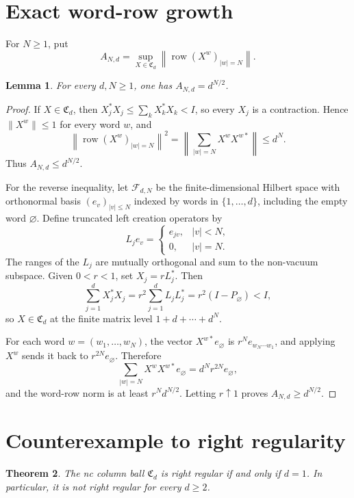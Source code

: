 \documentclass[10pt]{article}
\newtheorem{theorem}{Theorem}
\newtheorem{lemma}[theorem]{Lemma}
\newcommand{\Cball}{\mathfrak C}
\newcommand{\vac}{\varnothing}
\begin{document}
\section{Exact word-row growth}

For $N\ge1$, put
\[
 A_{N,d}=\sup_{X\in\Cball_d}
 \left\|\operatorname{row}(X^w)_{|w|=N}\right\|.
\]

\begin{lemma}\label{lem:growth}
For every $d,N\ge1$, one has $A_{N,d}=d^{N/2}$.
\end{lemma}

\begin{proof}
If $X\in\Cball_d$, then $X_j^*X_j\le\sum_kX_k^*X_k<I$, so every $X_j$ is a
contraction.  Hence $\|X^w\|\le1$ for every word $w$, and
\[
 \left\|\operatorname{row}(X^w)_{|w|=N}\right\|^2
 =\left\|\sum_{|w|=N}X^wX^{w*}\right\|
 \le d^N.
\]
Thus $A_{N,d}\le d^{N/2}$.

For the reverse inequality, let $\mathcal F_{d,N}$ be the finite-dimensional
Hilbert space with orthonormal basis $(e_v)_{|v|\le N}$ indexed by words in
$\{1,\ldots,d\}$, including the empty word $\vac$.  Define truncated left
creation operators by
\[
 L_je_v=\begin{cases}
 e_{jv},&|v|<N,\\
 0,&|v|=N.
 \end{cases}
\]
The ranges of the $L_j$ are mutually orthogonal and sum to the non-vacuum
subspace.  Given $0<r<1$, set $X_j=rL_j^*$.  Then
\[
 \sum_{j=1}^dX_j^*X_j
 =r^2\sum_{j=1}^dL_jL_j^*
 =r^2(I-P_{\vac})<I,
\]
so $X\in\Cball_d$ at the finite matrix level
$1+d+\cdots+d^N$.

For each word $w=(w_1,\ldots,w_N)$, the vector $X^{w*}e_{\vac}$ is
$r^Ne_{w_N\cdots w_1}$, and applying $X^w$ sends it back to
$r^{2N}e_{\vac}$.  Therefore
\[
 \sum_{|w|=N}X^wX^{w*}e_{\vac}
 =d^Nr^{2N}e_{\vac},
\]
and the word-row norm is at least $r^Nd^{N/2}$.  Letting $r\uparrow1$ proves
$A_{N,d}\ge d^{N/2}$.
\end{proof}

\section{Counterexample to right regularity}

\begin{theorem}\label{thm:main}
The nc column ball $\Cball_d$ is right regular if and only if $d=1$.  In
particular, it is not right regular for every $d\ge2$.
\end{theorem}
\end{document}
